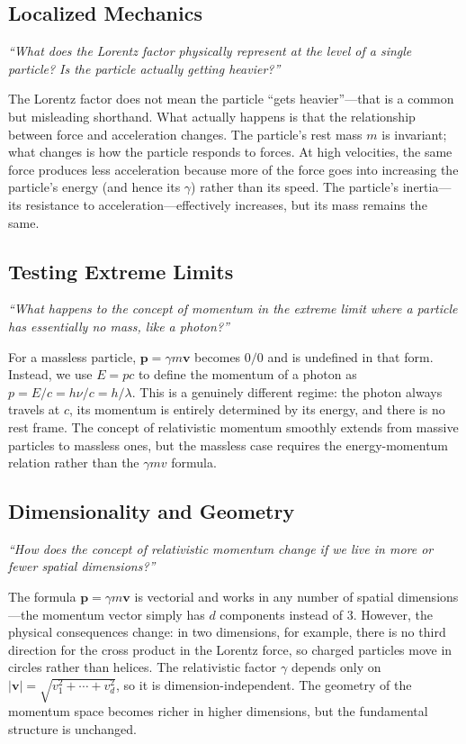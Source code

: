\documentclass[11pt,openright]{book}
\begin{document}
\subsection*{Localized Mechanics}
\textit{``What does the Lorentz factor physically represent at the level of a single particle? Is the particle actually getting heavier?''}

The Lorentz factor does not mean the particle ``gets heavier''---that is a common but misleading shorthand. What actually happens is that the relationship between force and acceleration changes. The particle's rest mass $m$ is invariant; what changes is how the particle responds to forces. At high velocities, the same force produces less acceleration because more of the force goes into increasing the particle's energy (and hence its $\gamma$) rather than its speed. The particle's inertia---its resistance to acceleration---effectively increases, but its mass remains the same.

\subsection*{Testing Extreme Limits}
\textit{``What happens to the concept of momentum in the extreme limit where a particle has essentially no mass, like a photon?''}

For a massless particle, $\mathbf{p} = \gamma m \mathbf{v}$ becomes $0/0$ and is undefined in that form. Instead, we use $E = pc$ to define the momentum of a photon as $p = E/c = h\nu/c = h/\lambda$. This is a genuinely different regime: the photon always travels at $c$, its momentum is entirely determined by its energy, and there is no rest frame. The concept of relativistic momentum smoothly extends from massive particles to massless ones, but the massless case requires the energy-momentum relation rather than the $\gamma m v$ formula.

\subsection*{Dimensionality and Geometry}
\textit{``How does the concept of relativistic momentum change if we live in more or fewer spatial dimensions?''}

The formula $\mathbf{p} = \gamma m \mathbf{v}$ is vectorial and works in any number of spatial dimensions---the momentum vector simply has $d$ components instead of 3. However, the physical consequences change: in two dimensions, for example, there is no third direction for the cross product in the Lorentz force, so charged particles move in circles rather than helices. The relativistic factor $\gamma$ depends only on $|\mathbf{v}| = \sqrt{v_1^2 + \cdots + v_d^2}$, so it is dimension-independent. The geometry of the momentum space becomes richer in higher dimensions, but the fundamental structure is unchanged.
\end{document}
